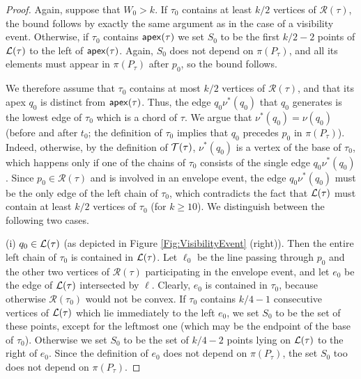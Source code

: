 \documentclass[11pt]{article}
\def\T{{\cal T}}
\def\L{{\cal L}}
\def\R{\mathcal{R}}
\def\apex{{\sf apex}}
\begin{document}
\begin{proof}
\medskip
{} 
Again, suppose that $W_0>k$.  If $\tau_0$ contains
at least $k/2$ vertices of $\R(\tau)$, the bound follows by exactly the same argument as in the case of a
visibility event. 
Otherwise, if $\tau_0$ contains $\apex(\tau)$ we set $S_0$ to be the first $k/2-2$ points of $\L(\tau)$ to the left of $\apex(\tau)$.
Again, $S_0$ does not depend on $\pi(P_\tau)$, and all its elements must appear in $\pi(P_\tau)$ after $p_0$, so the bound follows.





We therefore assume that $\tau_0$ contains at most $k/2$ vertices of
$\R(\tau)$, and that its apex $q_0$ is distinct from $\apex(\tau)$.
Thus, the edge $q_0\nu^*(q_0)$ that $q_0$ generates is the lowest edge of $\tau_0$ which is a chord of $\tau$. We argue that
$\nu^*(q_0)=\nu(q_0)$ (before and after $t_0$; the definition of $\tau_0$ implies that $q_0$ precedes $p_0$ in $\pi(P_\tau)$). Indeed, otherwise, by the definition of
$\T(\tau)$, $\nu^*(q_0)$ is a vertex of the base of $\tau_0$, which
happens only if one of the chains of $\tau_0$ consists of the single
edge $q_0\nu^*(q_0)$. Since $p_0\in \R(\tau)$ and is involved in an envelope event, the edge $q_0\nu^*(q_0)$ must be the only edge of the left chain of $\tau_0$, which contradicts the fact that $\L(\tau)$ must contain at least $k/2$ vertices of
$\tau_0$ (for $k\geq 10$).  We distinguish between the following two cases.

(i) $q_0\in \L(\tau)$ (as depicted in Figure \ref{Fig:VisibilityEvent}
(right)). Then the entire left chain of $\tau_0$ is contained in $\L(\tau)$. Let $\ell_0$ be the line passing through $p_0$ and the
other two vertices of $\R(\tau)$ participating in the envelope event,
and let $e_0$ be the edge of $\L(\tau)$ intersected by
$\ell$. Clearly, $e_0$ is contained in $\tau_0$, because otherwise
$\R(\tau_0)$ would not be convex.
If $\tau_0$
contains $k/4-1$ consecutive vertices of
$\L(\tau)$ which lie immediately to the left $e_0$, we set $S_0$ to be the set of these points, except for the leftmost one (which may be the endpoint of the base of $\tau_0$).
Otherwise we set $S_0$ to be the set of $k/4-2$ points lying on $\L(\tau)$ to the right of $e_0$. Since the definition of $e_0$ does not depend on $\pi(P_\tau)$, the set $S_0$ too does not depend on $\pi(P_\tau)$.


\end{proof}
\end{document}
